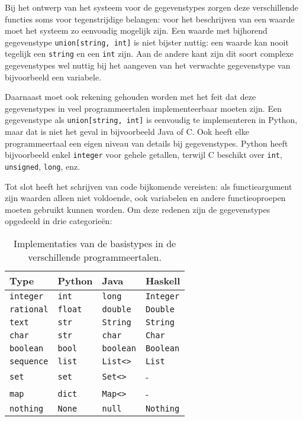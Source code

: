 Bij het ontwerp van het systeem voor de gegevenstypes zorgen deze verschillende functies soms voor tegenstrijdige belangen: voor het beschrijven van een waarde moet het systeem zo eenvoudig mogelijk zijn.
Een waarde met bijhorend gegevenstype \texttt{union[string, int]} is niet bijster nuttig: een waarde kan nooit tegelijk een \texttt{string} en een \texttt{int} zijn.
Aan de andere kant zijn dit soort complexe gegevenstypes wel nuttig bij het aangeven van het verwachte gegevenstype van bijvoorbeeld een variabele.

Daarnaast moet ook rekening gehouden worden met het feit dat deze gegevenstypes in veel programmeertalen implementeerbaar moeten zijn.
Een gegevenstype als \texttt{union[string, int]} is eenvoudig te implementeren in Python, maar dat is niet het geval in bijvoorbeeld Java of C\@.
Ook heeft elke programmeertaal een eigen niveau van details bij gegevenstypes.
Python heeft bijvoorbeeld enkel \texttt{integer} voor gehele getallen, terwijl C beschikt over \texttt{int}, \texttt{unsigned}, \texttt{long}, enz.

Tot slot heeft het schrijven van code bijkomende vereisten: als functieargument zijn waarden alleen niet voldoende, ook variabelen en andere functieoproepen moeten gebruikt kunnen worden.
Om deze redenen zijn de gegevenstypes opgedeeld in drie categorieën:

\begin{table}
    \centering
    \caption{Implementaties van de basistypes in de verschillende programmeertalen.}
    \label{tab:basistypes}
    \begin{tabular}{|l|lll|}
        \hline
        Type              & Python          & Java              & Haskell           \\
        \hline
        \texttt{integer}  & \texttt{int}    & \texttt{long}     & \texttt{Integer}  \\
        \texttt{rational} & \texttt{float}  & \texttt{double}   & \texttt{Double}   \\
        \texttt{text}     & \texttt{str}    & \texttt{String}   & \texttt{String}   \\
        \texttt{char}     & \texttt{str}    & \texttt{char}     & \texttt{Char}     \\
        \texttt{boolean}  & \texttt{bool}   & \texttt{boolean}  & \texttt{Boolean}  \\
        \texttt{sequence} & \texttt{list}   & \texttt{List<>}   & \texttt{List}     \\
        \texttt{set}      & \texttt{set}    & \texttt{Set<>}    & -        \\
        \texttt{map}      & \texttt{dict}   & \texttt{Map<>}    & -        \\
        \texttt{nothing}  & \texttt{None}   & \texttt{null}     & \texttt{Nothing}  \\
        \hline
    \end{tabular}
\end{table}

